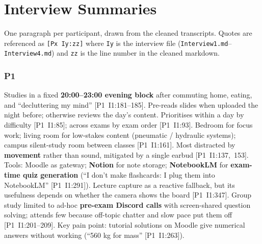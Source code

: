 \documentclass[a4paper,11pt]{article}
\begin{document}
\newpage
\section{Interview Summaries}\label{app:summaries}

One paragraph per participant, drawn from the cleaned transcripts.
Quotes are referenced as \texttt{[Px Iy:zz]} where \texttt{Iy} is the
interview file (\texttt{Interview1.md}--\texttt{Interview4.md}) and
\texttt{zz} is the line number in the cleaned markdown.

\subsubsection*{P1}
Studies in a fixed \textbf{20:00--23:00 evening block} after commuting
home, eating, and ``decluttering my mind'' [P1~I1:181--185]. Pre-reads
slides when uploaded the night before; otherwise reviews the day's
content. Prioritises within a day by difficulty [P1~I1:85]; across exams
by exam order [P1~I1:93]. Bedroom for focus work; living room for
low-stakes content (pneumatic / hydraulic systems); campus silent-study
room between classes [P1~I1:161]. Most distracted by \textbf{movement}
rather than sound, mitigated by a single earbud
[P1~I1:137,~153]. Tools: Moodle as gateway; \textbf{Notion} for note
storage; \textbf{NotebookLM} for \textbf{exam-time quiz generation}
(``I don't make flashcards: I plug them into NotebookLM''
[P1~I1:291]). Lecture capture as a reactive fallback, but its usefulness
depends on whether the camera shows the board [P1~I1:347]. Group study
limited to ad-hoc \textbf{pre-exam Discord calls} with screen-shared
question solving; attends few because off-topic chatter and slow pace
put them off [P1~I1:201--209]. Key pain point: tutorial solutions on
Moodle give numerical answers without working (``560 kg for mass''
[P1~I1:263]).
\end{document}
